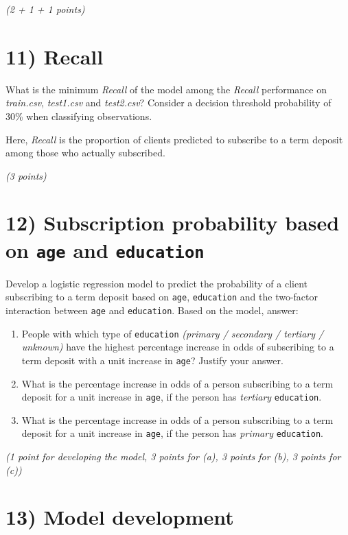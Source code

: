 \documentclass[
  letterpaper,
  DIV=11,
  numbers=noendperiod]{scrreprt}
\begin{document}
\emph{(2 + 1 + 1 points)}

\section{11) Recall}\label{recall}

What is the minimum \emph{Recall} of the model among the \emph{Recall}
performance on \emph{train.csv}, \emph{test1.csv} and \emph{test2.csv}?
Consider a decision threshold probability of 30\% when classifying
observations.

Here, \emph{Recall} is the proportion of clients predicted to subscribe
to a term deposit among those who actually subscribed.

\emph{(3 points)}

\section{\texorpdfstring{12) Subscription probability based on
\texttt{age} and
\texttt{education}}{12) Subscription probability based on age and education}}\label{subscription-probability-based-on-age-and-education}

Develop a logistic regression model to predict the probability of a
client subscribing to a term deposit based on \texttt{age},
\texttt{education} and the two-factor interaction between \texttt{age}
and \texttt{education}. Based on the model, answer:

\begin{enumerate}
\def\labelenumi{\alph{enumi}.}
\item
  People with which type of \texttt{education} \emph{(primary /
  secondary / tertiary / unknown)} have the highest percentage increase
  in odds of subscribing to a term deposit with a unit increase in
  \texttt{age}? Justify your answer.
\item
  What is the percentage increase in odds of a person subscribing to a
  term deposit for a unit increase in \texttt{age}, if the person has
  \emph{tertiary} \texttt{education}.
\item
  What is the percentage increase in odds of a person subscribing to a
  term deposit for a unit increase in \texttt{age}, if the person has
  \emph{primary} \texttt{education}.
\end{enumerate}

\emph{(1 point for developing the model, 3 points for (a), 3 points for
(b), 3 points for (c))}

\section{13) Model development}\label{model-development}
\end{document}
